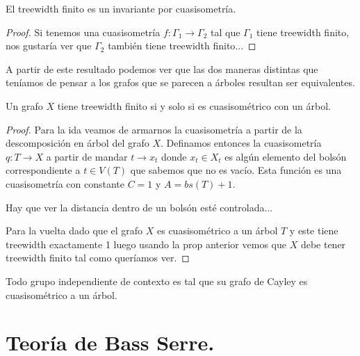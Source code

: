 \documentclass[tesis.tex]{subfiles}
\begin{document}
\begin{lema}
	El treewidth finito es un invariante por cuasisometría.
\end{lema}
\begin{proof}
Si tenemos una cuasisometría $f:\Gamma_1 \to \Gamma_2$ tal que $\Gamma_1$ tiene treewidth finito, nos gustaría ver que $\Gamma_2$ también tiene treewidth finito...
\end{proof}

A partir de este resultado podemos ver que las dos maneras distintas que teníamos de pensar a los grafos que se parecen a árboles resultan ser equivalentes.

\begin{prop}
	Un grafo $X$ tiene treewidth finito si y solo si es cuasisométrico con un árbol.
\end{prop}
\begin{proof}
	
Para la ida veamos de armarnos la cuasisometría a partir de la descomposición en árbol del grafo $X$. Definamos entonces la cuasisometría $q: T \to X$ a partir de mandar $t \to x_t$ donde $x_t \in X_t$ es algún elemento del bolsón correspondiente a $t \in V(T)$ que sabemos que no es vacío. Esta función es una cuasisometría con constante $C=1$ y $A = bs(T) + 1$.

Hay que ver la distancia dentro de un bolsón esté controlada...


Para la vuelta dado que el grafo $X$ es cuasisométrico a un árbol $T$ y este tiene treewidth exactamente 1 luego usando la prop anterior vemos que $X$ debe tener treewidth finito tal como queríamos ver.
\end{proof}

\begin{coro}
	Todo grupo independiente de contexto es tal que su grafo de Cayley es cuasisométrico a un árbol.
\end{coro}

\section{Teoría de Bass Serre.}



	
	
	
	
\end{document}
